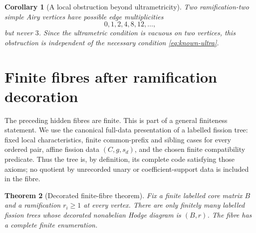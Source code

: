 \documentclass[11pt,a4paper]{amsart}
\theoremstyle{plain}
\newtheorem{theorem}{Theorem}[section]
\newtheorem{corollary}[theorem]{Corollary}
\theoremstyle{definition}
\begin{document}
\begin{corollary}[A local obstruction beyond ultrametricity]\label{cor:edge-three}
Two ramification-two simple Airy vertices have possible edge multiplicities
\[
 0,1,2,4,8,12,\ldots,
\]
but never $3$.  Since the ultrametric condition is vacuous on two vertices, this obstruction is
independent of the necessary condition \eqref{eq:known-ultra}.
\end{corollary}

\section{Finite fibres after ramification decoration}\label{sec:finite}

The preceding hidden fibres are finite.  This is part of a general finiteness statement.
We use the canonical full-data presentation of a labelled fission tree: fixed local
characteristics, finite common-prefix and sibling cases for every ordered pair, affine fission data
$(C,g,s_d)$, and the chosen finite compatibility predicate.  Thus the tree is, by definition, its
complete code satisfying those axioms; no quotient by unrecorded unary or coefficient-support data
is included in the fibre.

\begin{theorem}[Decorated finite-fibre theorem]\label{thm:finite-fibre}
Fix a finite labelled core matrix $B$ and a ramification $r_i\ge1$ at every vertex.  There are only
finitely many labelled fission trees whose decorated nonabelian Hodge diagram is $(B,r)$.  The
fibre has a complete finite enumeration.
\end{theorem}
\end{document}
